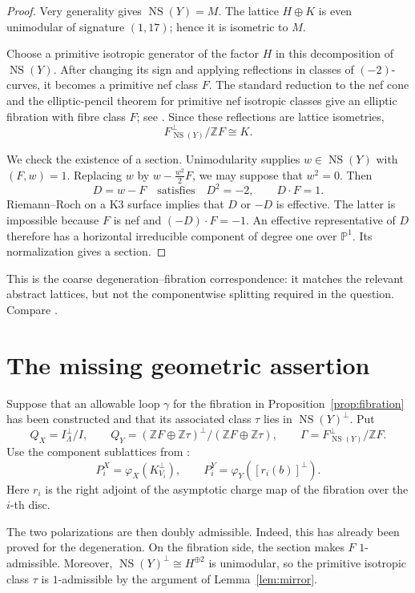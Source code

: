 \documentclass[11pt]{article}
\newcommand{\Z}{\mathbb Z}
\newcommand{\NS}{\operatorname{NS}}
\theoremstyle{remark}
\begin{document}
\begin{proof}
Very generality gives \(\NS(Y)=M\).
The lattice \(H\oplus K\) is even unimodular of signature \((1,17)\);
hence it is isometric to \(M\).

Choose a primitive isotropic generator of the factor \(H\) in this
decomposition of \(\NS(Y)\).
After changing its sign and applying reflections in classes of
\((-2)\)-curves, it becomes a primitive nef class \(F\).
The standard reduction to the nef cone and the elliptic-pencil
theorem for primitive nef isotropic classes give an elliptic
fibration with fibre class \(F\); see
\cite[Chapter~8, Section~2, and Chapter~11, Section~1]{Huy16}.
Since these reflections are lattice isometries,
\[
 F^\perp_{\NS(Y)}/\Z F\cong K.
\]

We check the existence of a section.
Unimodularity supplies \(w\in\NS(Y)\) with \((F,w)=1\).
Replacing \(w\) by \(w-\frac{w^2}{2}F\), we may suppose that \(w^2=0\).
Then
\[
 D=w-F
 \quad\text{satisfies}\quad
 D^2=-2,\qquad D\cdot F=1.
\]
Riemann--Roch on a K3 surface implies that \(D\) or \(-D\) is effective.
The latter is impossible because \(F\) is nef and
\((-D)\cdot F=-1\).
An effective representative of \(D\) therefore has a horizontal
irreducible component of degree one over \(\mathbb P^1\).
Its normalization gives a section.
\end{proof}

This is the coarse degeneration--fibration correspondence: it matches
the relevant abstract lattices, but not the componentwise splitting
required in the question.  Compare \cite[Proposition~4.1]{DHT17}.

\section{The missing geometric assertion}

Suppose that an allowable loop \(\gamma\) for the fibration in
Proposition~\ref{prop:fibration} has been constructed and that its
associated class \(\tau\) lies in \(\NS(Y)^\perp\).
Put
\[
 Q_X=I^\perp_\Lambda/I,\qquad
 Q_Y=(\Z F\oplus\Z\tau)^\perp/(\Z F\oplus\Z\tau),\qquad
 \Gamma=F^\perp_{\NS(Y)}/\Z F.
\]
Use the component sublattices from \cite[Definition~5.1]{GT24}:
\[
 P_i^X=\varphi_X(K_{V_i}^{\perp}),
 \qquad
 P_i^Y=\varphi_Y([r_i(b)]^{\perp}).
\]
Here \(r_i\) is the right adjoint of the asymptotic charge map of
the fibration over the \(i\)-th disc.

The two polarizations are then doubly admissible.
Indeed, this has already been proved for the degeneration.
On the fibration side, the section makes \(F\) \(1\)-admissible.
Moreover, \(\NS(Y)^\perp\cong H^{\oplus2}\) is unimodular, so the
primitive isotropic class \(\tau\) is \(1\)-admissible by the argument
of Lemma~\ref{lem:mirror}.
\end{document}
